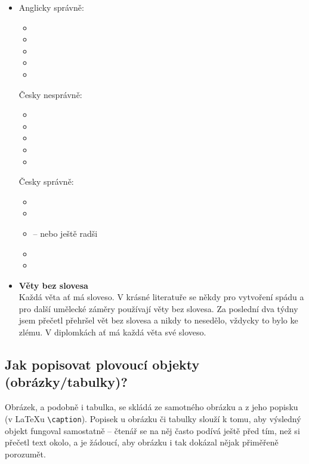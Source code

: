 \begin{itemize}
	\item
    {
    	Anglicky správně:
        \begin{itemize}
        	\item{}
  			\item{}
  			\item{}
  			\item{}
  			\item{}
        \end{itemize}

        Česky nesprávně:
		\begin{itemize}
  			\item{}
  			\item{}
  			\item{}
  			\item{}
  			\item{}
		\end{itemize}

		Česky správně:
		\begin{itemize}
  			\item{}
  			\item{}
  			\item{ -- nebo ještě radši }
  			\item{}
  			\item{}
		\end{itemize}

    }
    \item
    {
    	\textbf{Věty bez slovesa} \\
		Každá věta ať má sloveso. V krásné literatuře se někdy pro vytvoření spádu a pro další umělecké záměry používají věty bez slovesa. Za poslední dva týdny jsem přečetl přehršel vět bez slovesa a nikdy to nesedělo, vždycky to bylo ke zlému. V diplomkách ať má každá věta své sloveso.
    }
\end{itemize}



\subsection*{Jak popisovat plovoucí objekty (obrázky/tabulky)?}
Obrázek, a podobně i tabulka, se skládá ze samotného obrázku a z jeho popisku (v \LaTeX u \texttt{\textbackslash caption}). Popisek u obrázku či tabulky slouží k tomu, aby výsledný objekt fungoval samostatně -- čtenář se na něj často podívá ještě před tím, než si přečetl text okolo, a je žádoucí, aby obrázku i tak dokázal nějak přiměřeně porozumět.

